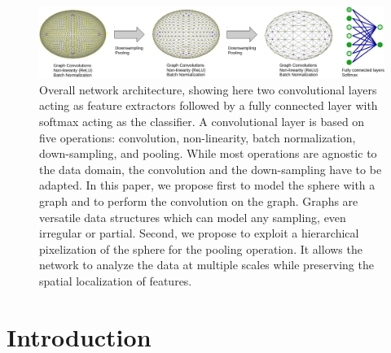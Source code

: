 \documentclass[final,twocolumn,3p,times,authoryear]{elsarticle}
\newcommand{\nati}[1]{{\color[rgb]{.1,.6,.1}{#1}}}
\newcommand{\1}{\b{1}}              %
\newcommand{\0}{\b{0}}              %
\begin{document}
\begin{figure}[!ht]
	\centering
	\includegraphics[width=\linewidth]{figures/architecture}
	\caption{Overall network architecture, showing here two convolutional layers acting as feature extractors followed by a fully connected layer with softmax acting as the classifier. A convolutional layer is based on five operations: convolution, non-linearity, batch normalization, down-sampling, and pooling. While most operations are agnostic to the data domain, the convolution and the down-sampling have to be adapted. In this paper, we propose first to model the sphere with a graph and to perform the convolution on the graph. Graphs are versatile data structures which can model any sampling, even irregular or partial. Second, we propose to exploit a hierarchical pixelization of the sphere for the pooling operation. It allows the network to analyze the data at multiple scales while preserving the spatial localization of features.
    \nati{Great plot! Could you make the sphere round? If you use the current code in paper plot notebook, they will be.}
    }
\end{figure}

\section{Introduction}
\label{sec:intro}

\end{document}
